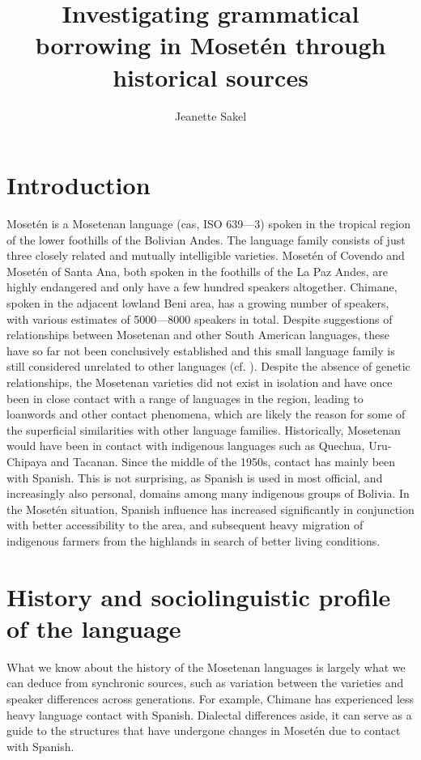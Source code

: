 \documentclass[output=paper,colorlinks,citecolor=brown
]{langscibook}
\author{Jeanette Sakel\orcid{}\affiliation{University of the West of England}}
\title[Investigating grammatical borrowing in Mosetén]{Investigating grammatical borrowing in Mosetén through historical sources}
\begin{document}
\maketitle

\section{Introduction}
Mosetén is a Mosetenan language (cas, ISO 639—3) spoken in the tropical region of the lower foothills of the Bolivian Andes. The language family consists of just three closely related and mutually intelligible varieties. Mosetén of Covendo and Mosetén of Santa Ana, both spoken in the foothills of the La Paz Andes, are highly endangered and only have a few hundred speakers altogether. Chimane, spoken in the adjacent lowland Beni area, has a growing number of speakers, with various estimates of 5000—8000 speakers in total. Despite suggestions of relationships between Mosetenan and other South American languages, these have so far not been conclusively established and this small language family is still considered unrelated to other languages (cf. \citealt{sakel2004grammar}). Despite the absence of genetic relationships, the Mosetenan varieties did not exist in isolation and have once been in close contact with a range of languages in the region, leading to loanwords and other contact phenomena, which are likely the reason for some of the superficial similarities with other language families. Historically, Mosetenan would have been in contact with indigenous languages such as Quechua, Uru-Chipaya and Tacanan. Since the middle of the 1950s, contact has mainly been with Spanish. This is not surprising, as Spanish is used in most official, and increasingly also personal, domains among many indigenous groups of Bolivia. In the Mosetén situation, Spanish influence has increased significantly in conjunction with better accessibility to the area, and subsequent heavy migration of indigenous farmers from the highlands in search of better living conditions.


\section{History and sociolinguistic profile of the language}
What we know about the history of the Mosetenan languages is largely what we can deduce from synchronic sources, such as variation between the varieties and speaker differences across generations. For example, Chimane has experienced less heavy language contact with Spanish. Dialectal differences aside, it can serve as a guide to the structures that have undergone changes in Mosetén due to contact with Spanish.
\end{document}
